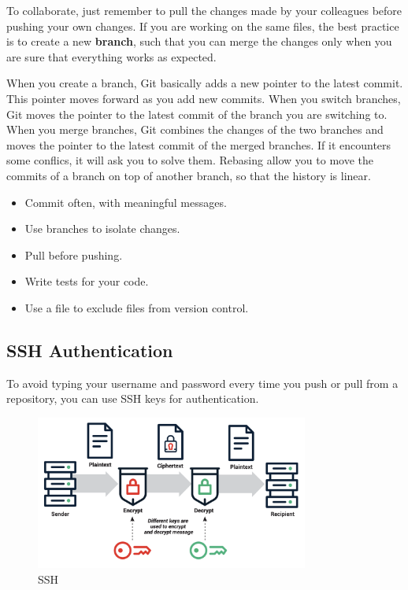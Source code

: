 \vspace{0.5em}

To collaborate, just remember to pull the changes made by your colleagues before pushing your own changes. If you are working on the same files, the best practice is to create a new \textbf{branch},
such that you can merge the changes only when you are sure that everything works as expected.

When you create a branch, Git basically adds a new pointer to the latest commit. This pointer moves forward as you add new commits. 
When you switch branches, Git moves the pointer to the latest commit of the branch you are switching to.
When you merge branches, Git combines the changes of the two branches and moves the pointer to the latest commit of the merged branches. If it encounters some conflics, it will ask you to solve them.
Rebasing allow you to move the commits of a branch on top of another branch, so that the history is linear.

\begin{tipsblock}
\begin{itemize}
    \item Commit often, with meaningful messages.
    \item Use branches to isolate changes.
    \item Pull before pushing.
    \item Write tests for your code.
    \item Use a  file to exclude files from version control.
\end{itemize}
\end{tipsblock}

\subsection{SSH Authentication}

To avoid typing your username and password every time you push or pull from a repository, you can use SSH keys for authentication.

\begin{figure}[H]
    \centering
    \includegraphics[width=0.8\textwidth]{assets/ssh.png}
    \caption{SSH}
    \label{fig:ssh}
\end{figure}

